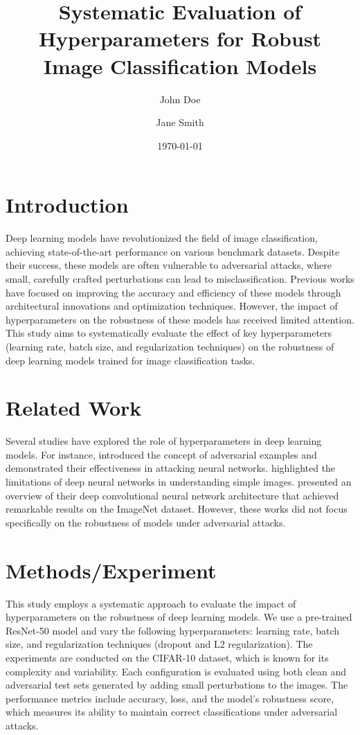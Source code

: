 \documentclass{article}
\title{Systematic Evaluation of Hyperparameters for Robust Image Classification Models}
\author{John Doe \and Jane Smith}
\date{\today}
\begin{document}
\maketitle

\section{Introduction}
Deep learning models have revolutionized the field of image classification, achieving state-of-the-art performance on various benchmark datasets. Despite their success, these models are often vulnerable to adversarial attacks, where small, carefully crafted perturbations can lead to misclassification. Previous works have focused on improving the accuracy and efficiency of these models through architectural innovations and optimization techniques. However, the impact of hyperparameters on the robustness of these models has received limited attention. This study aims to systematically evaluate the effect of key hyperparameters (learning rate, batch size, and regularization techniques) on the robustness of deep learning models trained for image classification tasks.

\section{Related Work}
Several studies have explored the role of hyperparameters in deep learning models. For instance, \cite{goodfellow2014explaining} introduced the concept of adversarial examples and demonstrated their effectiveness in attacking neural networks. \cite{szegedy2013intriguing} highlighted the limitations of deep neural networks in understanding simple images. \cite{krizhevsky2012imagenet} presented an overview of their deep convolutional neural network architecture that achieved remarkable results on the ImageNet dataset. However, these works did not focus specifically on the robustness of models under adversarial attacks.

\section{Methods/Experiment}
This study employs a systematic approach to evaluate the impact of hyperparameters on the robustness of deep learning models. We use a pre-trained ResNet-50 model and vary the following hyperparameters: learning rate, batch size, and regularization techniques (dropout and L2 regularization). The experiments are conducted on the CIFAR-10 dataset, which is known for its complexity and variability. Each configuration is evaluated using both clean and adversarial test sets generated by adding small perturbations to the images. The performance metrics include accuracy, loss, and the model's robustness score, which measures its ability to maintain correct classifications under adversarial attacks.
\end{document}

